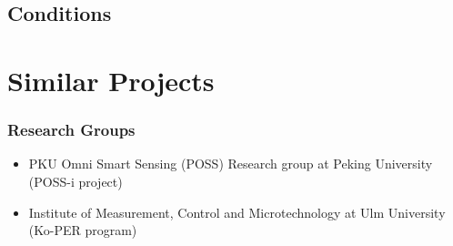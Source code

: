 \documentclass{beamer}
\begin{document}
\subsection{Conditions}


\section{Similar Projects}
\frame
{
	\frametitle{Research Groups}
	\begin{itemize}
		\item PKU Omni Smart Sensing (POSS) Research group at Peking University (POSS-i project)
		\item Institute of Measurement, Control and Microtechnology at Ulm University (Ko-PER program)
	\end{itemize}
}
\end{document}
